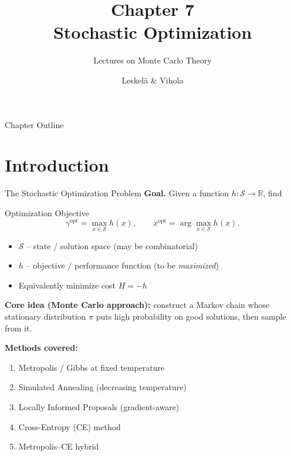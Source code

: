 \documentclass[aspectratio=169,10pt]{beamer}
\title[Ch.7 Stochastic Optimization]{Chapter 7\\Stochastic Optimization}
\subtitle{Lectures on Monte Carlo Theory}
\author{Leskel\"{a} \& Vihola}
\date{}
\newcommand{\R}{\mathbb{R}}
\newcommand{\calS}{\mathcal{S}}
\begin{document}
\begin{frame}
  \titlepage
\end{frame}

\begin{frame}{Chapter Outline}
  \tableofcontents
\end{frame}

\section{Introduction}

\begin{frame}{The Stochastic Optimization Problem}
  \textbf{Goal.}  Given a function $h : \calS \to \R$, find

  \begin{block}{Optimization Objective}
    \[
      \gamma^{\mathrm{opt}} = \max_{x \in \calS} h(x),
      \qquad
      x^{\mathrm{opt}} = \arg\max_{x \in \calS} h(x).
    \]
    \begin{itemize}
      \item $\calS$ -- state / solution space (may be combinatorial)
      \item $h$ -- objective / performance function (to be \emph{maximized})
      \item Equivalently minimize cost $H = -h$
    \end{itemize}
  \end{block}

  \medskip
  \textbf{Core idea (Monte Carlo approach):} construct a Markov chain
  whose stationary distribution $\pi$ puts high probability on good
  solutions, then sample from it.

  \medskip
  \textbf{Methods covered:}
  \begin{enumerate}
    \item Metropolis / Gibbs at fixed temperature
    \item Simulated Annealing (decreasing temperature)
    \item Locally Informed Proposals (gradient-aware)
    \item Cross-Entropy (CE) method
    \item Metropolis–CE hybrid
  \end{enumerate}
\end{frame}
\end{document}
